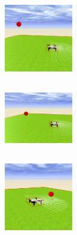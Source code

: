 \begin{figure}[htbp]
\begin{subfigure}[t]{0.2\textwidth}
    \includegraphics[width=3cm, height=3cm]{img/followBallTello7.png}
\label{fig:figure2_7}
\end{subfigure}\hfill
\begin{subfigure}[t]{0.2\textwidth}
    \includegraphics[width=3cm, height=3cm]{img/followBallTello8.png}
\label{fig:figure2_8}
\end{subfigure}\hfill
\begin{subfigure}[t]{0.2\textwidth}
    \includegraphics[width=3cm, height=3cm]{img/followBallTello9.png}
\label{fig:figure2_9}
\end{subfigure}


\end{figure}
